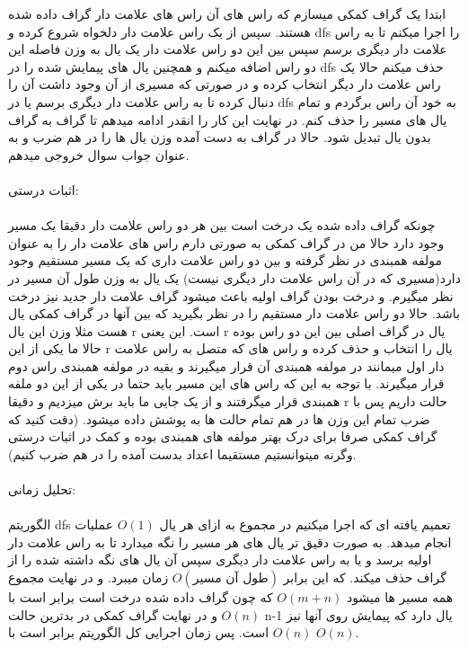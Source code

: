 \problem{}
ابتدا یک گراف کمکی میسازم که راس های آن راس های علامت دار گراف داده شده هستند.
سپس
از یک راس علامت دار دلخواه شروع کرده و dfs را اجرا میکنم تا به راس
علامت دار دیگری برسم
سپس بین این دو راس علامت دار یک یال به وزن فاصله این دو راس اضافه میکنم و همچنین یال های پیمایش شده را
در dfs حذف میکنم
حالا یک راس علامت دار دیگر انتخاب کرده
و در صورتی که مسیری از آن وجود داشت آن را دنبال کرده تا به راس 
علامت دار دیگری برسم یا در dfs به خود آن راس برگردم و تمام یال های مسیر
را حذف کنم.
در نهایت این کار را انقدر ادامه میدهم تا گراف به گراف بدون یال تبدیل شود.
حالا در گراف به دست آمده وزن یال ها را در هم ضرب و به عنوان جواب سوال خروجی میدهم.
\\\\
اثبات درستی:\\\\
چونکه گراف داده شده یک درخت است بین هر دو راس علامت دار دقیقا یک مسیر
وجود دارد حالا من در گراف کمکی به صورتی دارم راس های علامت دار را به عنوان مولفه
همبندی در نظر گرفته و بین دو راس علامت داری که یک مسیر مستقیم وجود دارد(مسیری که در آن راس علامت دار دیگری نیست)
یک یال به وزن طول آن مسیر در نظر میگیرم.
و درخت بودن گراف اولیه باعث میشود گراف
علامت دار جدید نیز درخت باشد.
حالا دو راس علامت دار مستقیم را در نظر بگیرید که بین آنها در گراف کمکی یال هست
مثلا وزن این یال r است.
این یعنی r یال در گراف اصلی بین این دو راس بوده
حالا ما یکی از این r یال را انتخاب و حذف کرده
و راس های که متصل به راس علامت دار اول میمانند
در مولفه همبندی آن قرار میگیرند و بقیه در مولفه همبندی
راس دوم قرار میگیرند.
با توجه به این که راس های این مسیر باید حتما در یکی از این دو ملفه همبندی قرار میگرفتند
و از یک جایی ما باید برش میزدیم و دقیقا r حالت داریم
پس با ضرب تمام این وزن ها در هم تمام حالت ها به پوشش داده میشود.
(دقت کنید که گراف کمکی صرفا برای درک بهتر مولفه های همبندی بوده و کمک در اثبات درستی وگرنه میتوانستیم
مستقیما اعداد بدست آمده را در هم ضرب کنیم).
\\\\
تحلیل زمانی:\\\\
الگوریتم dfs تعمیم یافته ای که اجرا میکنیم در مجموع
به ازای هر یال $O(1)$ عملیات انجام میدهد.
به صورت دقیق تر یال های هر مسیر را نگه میدارد تا به راس علامت دار اولیه برسد
و یا به راس علامت دار دیگری سپس آن یال های نگه داشته شده را از گراف حذف میکند.
که این برابر $O(\text{طول آن مسیر})$
زمان میبرد.
و در نهایت مجموع همه مسیر ها میشود $O(m+n)$
که چون گراف داده شده درخت است برابر است با 
$O(n)$ و در نهایت گراف کمکی در بدترین حالت n-1 یال دارد
که پیمایش روی آنها نیز $O(n)$ است.
پس زمان اجرایی کل الگوریتم برابر است با $O(n)$.